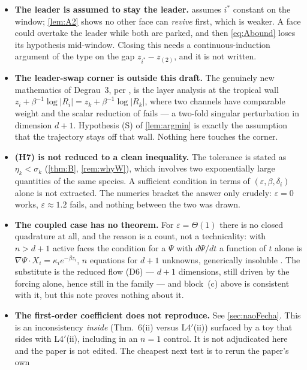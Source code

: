 \documentclass[11pt]{article}
\theoremstyle{remark}
\newcommand{\hyplabel}[1]{\textup{(#1)}}
\begin{document}
\begin{itemize}
\item[(D1)] \textbf{The leader is assumed to stay the leader.} 
assumes $i^\ast$ constant on the window; \cref{lem:A2} shows no other face can
\emph{revive} first, which is weaker. A face could overtake the leader while
both are parked, and then \eqref{eq:Abound} loses its hypothesis mid-window.
Closing this needs a continuous-induction argument of the
\cite[L5$'$]{paper} type on the gap $z_{i^\ast}-z_{(2)}$, and it is not written.
\item[(D2)] \textbf{The leader-swap corner is outside this draft.} The genuinely
new mathematics of Degrau~3, per \cite[\S6]{scoping}, is the layer analysis at
the tropical wall $z_i+\beta^{-1}\log|R_i|=z_k+\beta^{-1}\log|R_k|$, where two
channels have comparable weight and the scalar reduction of
\cite[L6$'$]{paper} fails --- a two-fold singular perturbation in dimension
$d+1$. Hypothesis (S) of \cref{lem:argmin} is exactly the assumption that the
trajectory stays off that wall. Nothing here touches the corner.
\item[(D3)] \textbf{\hyplabel{H7} is not reduced to a clean inequality.} The
tolerance is stated as $\eta_k<\sigma_k$ (\cref{thm:B}, \cref{rem:whyW}), which
involves two exponentially large quantities of the same species. A sufficient
condition in terms of $(\varepsilon,\beta,\delta_i)$ alone is not extracted.
The numerics bracket the answer only crudely: $\varepsilon=0$ works,
$\varepsilon\approx1.2$ fails, and nothing between the two was drawn.
\item[(D4)] \textbf{The coupled case has no theorem.} For $\varepsilon=\Theta(1)$
there is no closed quadrature at all, and the reason is a count, not a
technicality: with $n>d+1$ active faces the condition for a $\Psi$ with
$d\Psi/dt$ a function of $t$ alone is $\nabla\Psi\cdot X_i=\kappa_ie^{-\beta
z_i}$, $n$ equations for $d+1$ unknowns, generically insoluble
\cite[\S2.2]{scoping}. The substitute is the reduced flow (D6) --- $d+1$
dimensions, still driven by the forcing alone, hence still in the
\cite[Thm.~6]{paper} family --- and block~(c) above is consistent with it, but
this note proves nothing about it.
\item[(D5)] \textbf{The first-order coefficient does not reproduce.} See
\cref{sec:naoFecha}. This is an inconsistency \emph{inside} \cite{paper}
(Thm.~6(ii) versus L4$'$(ii)) surfaced by a toy that sides with L4$'$(ii),
including in an $n=1$ control. It is not adjudicated here and the paper is not
edited. The cheapest next test is to rerun the paper's own

\end{itemize}
\end{document}
